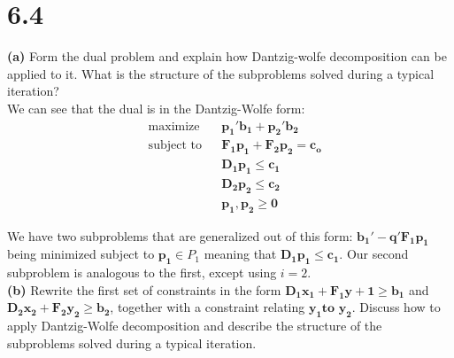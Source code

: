 \documentclass{article}
\begin{document}
\section*{6.4}

\noindent
\textbf{(a)}
Form the dual problem and explain how Dantzig-wolfe decomposition can be applied to it.  What is the structure of the subproblems solved during a typical iteration? \\

\noindent
We can see that the dual is in the Dantzig-Wolfe form:
\begin{equation*}
\begin{aligned}
& \text{maximize} && \mathbf{p_1' b_1 + p_2' b_2} \\
& \text{subject to} &&  \mathbf{F_1 p_1 + F_2 p_2 = c_o} \\
& & & \mathbf{D_1 p_1 \leq c_1} \\
& & & \mathbf{D_2 p_2 \leq c_2} \\
& & & \mathbf{p_1, p_2 \geq 0}
\end{aligned}
\end{equation*}

\noindent
We have two subproblems that are generalized out of this form: $\mathbf{b_1' - q'F_1 p_1}$ being minimized subject to $\mathbf{p_1} \in P_1$ meaning that $\mathbf{D_1 p_1 \leq c_1}$.  Our second subproblem is analogous to the first, except using $i = 2$. \\

\noindent
\textbf{(b)} Rewrite the first set of constraints in the form $\mathbf{D_1 x_1 + F_1 y+1 \geq b_1}$ and $\mathbf{D_2 x_2 + F_2 y_2 \geq b_2}$, together with a constraint relating $\mathbf{y_1 \text{to } y_2}$.  Discuss how to apply Dantzig-Wolfe decomposition and describe the structure of the subproblems solved during a typical iteration.
\end{document}
